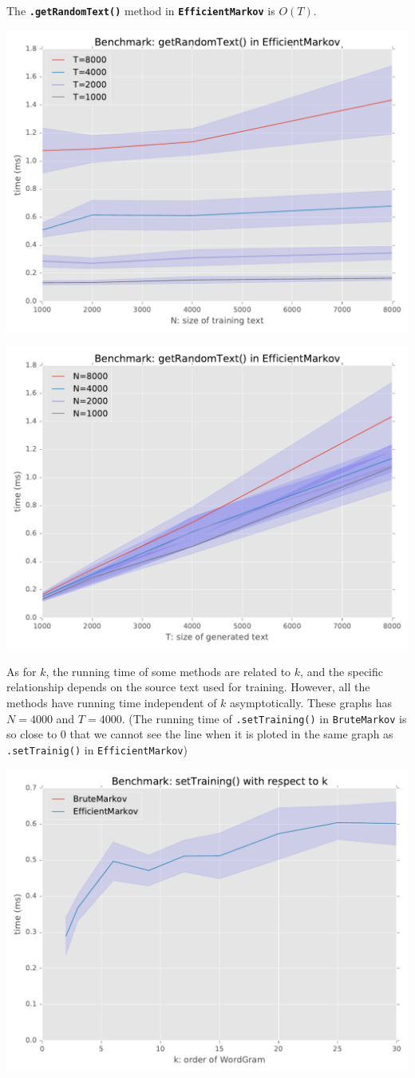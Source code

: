 \documentclass[11pt]{article}
\begin{document}
The \texttt{\bf .getRandomText()} method in \texttt{\bf EfficientMarkov} is $O(T)$.

\centerline{\includegraphics[width=0.6\linewidth]{getRandomText_EfficientMarkov_N.pdf}}

\centerline{\includegraphics[width=0.6\linewidth]{getRandomText_EfficientMarkov_T.pdf}}

As for $k$, the running time of some methods are related to $k$, and the specific relationship depends on the source text used for training. However, all the methods have running time independent of $k$ asymptotically. These graphs has $N=4000$ and $T=4000$. (The running time of \texttt{.setTraining()} in \texttt{BruteMarkov} is so close to $0$ that we cannot see the line when it is ploted in the same graph as \texttt{.setTrainig()} in \texttt{EfficientMarkov})

\centerline{\includegraphics[width=0.6\linewidth]{setTraining_k.pdf}}
\end{document}
